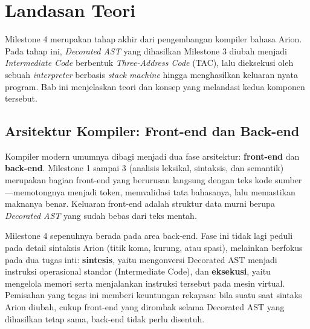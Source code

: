 \section{Landasan Teori}

Milestone 4 merupakan tahap akhir dari pengembangan kompiler bahasa Arion. Pada
tahap ini, \emph{Decorated AST} yang dihasilkan Milestone 3 diubah menjadi
\emph{Intermediate Code} berbentuk \emph{Three-Address Code} (TAC), lalu
dieksekusi oleh sebuah \emph{interpreter} berbasis \emph{stack machine} hingga
menghasilkan keluaran nyata program. Bab ini menjelaskan teori dan konsep yang
melandasi kedua komponen tersebut.

\subsection{Arsitektur Kompiler: Front-end dan Back-end}

Kompiler modern umumnya dibagi menjadi dua fase arsitektur: \textbf{front-end}
dan \textbf{back-end}. Milestone 1 sampai 3 (analisis leksikal, sintaksis, dan
semantik) merupakan bagian front-end yang berurusan langsung dengan teks kode
sumber---memotongnya menjadi token, memvalidasi tata bahasanya, lalu memastikan
maknanya benar. Keluaran front-end adalah struktur data murni berupa
\emph{Decorated AST} yang sudah bebas dari teks mentah.

Milestone 4 sepenuhnya berada pada area back-end. Fase ini tidak lagi peduli
pada detail sintaksis Arion (titik koma, kurung, atau spasi), melainkan berfokus
pada dua tugas inti: \textbf{sintesis}, yaitu mengonversi Decorated AST menjadi
instruksi operasional standar (Intermediate Code), dan \textbf{eksekusi}, yaitu
mengelola memori serta menjalankan instruksi tersebut pada mesin virtual. Pemisahan
yang tegas ini memberi keuntungan rekayasa: bila suatu saat sintaks Arion diubah,
cukup front-end yang dirombak selama Decorated AST yang dihasilkan tetap sama,
back-end tidak perlu disentuh.

